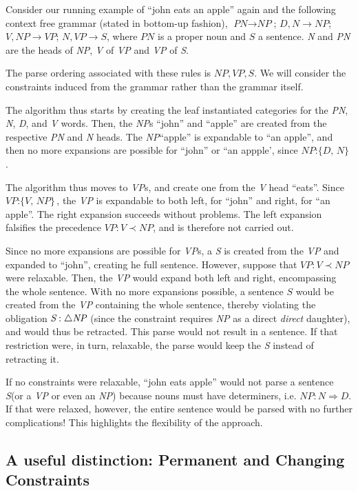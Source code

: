 \documentclass{llncs}
\newcommand{\constituency}[2]{\textit{#1} : \textit{#2}}
\newcommand{\obligation}[2]{\textit{#1} : \triangle \textit{#2}}
\newcommand{\precedence}[3]{\textit{#1} : \textit{#2} \prec \textit{#3}}
\newcommand{\requirement}[3]{\textit{#1} : \textit{#2} \Rightarrow \textit{#3}}
\newcommand{\PN}{\textit{PN}\xspace}
\newcommand{\NP}{\textit{NP}\xspace}
\newcommand{\VP}{\textit{VP}\xspace}
\newcommand{\Se}{\textit{S}\xspace}
\newcommand{\N}{\textit{N}\xspace}
\newcommand{\V}{\textit{V}\xspace}
\newcommand{\D}{\textit{D}\xspace}
\begin{document}
\begin{example}
  Consider our running example of ``john eats an apple'' again and the following context free grammar (stated in bottom-up fashion), $\PN \to \NP$; $D, N \to \NP$; $V,\NP \to \VP$; $N, \VP \to S$, where $\PN$ is a proper noun and $S$ a sentence. \N and \PN are the heads of \NP, \V of \VP and \VP of \Se.
  
  The parse ordering associated with these rules is $\NP,\VP,\Se$. We will consider the constraints induced from the grammar rather than the grammar itself.

The algorithm thus starts by creating the leaf instantiated categories for the \PN, \N, \D, and \V words. Then, the \NP{}s ``john'' and ``apple'' are created from the respective \PN and \N heads. The \NP ``apple'' is expandable to ``an apple'', and then no more expansions are possible for ``john'' or ``an appple', since $\constituency{NP}{\{D, N\}}$.

The algorithm thus moves to \VP{}s, and create one from the \V head ``eats''. Since $\constituency{VP}{\{V, NP\}}$, the \VP is expandable to both left, for ``john'' and right, for ``an apple''. The right expansion succeeds without problems. The left expansion falsifies the precedence $\precedence{VP}{V}{NP}$, and is therefore not carried out.

Since no more expansions are possible for \VP{}s, a \Se is created from the \VP and expanded to ``john'', creating he full sentence. However, suppose that $\precedence{VP}{V}{NP}$ were relaxable. Then, the \VP would expand both left and right, encompassing the whole sentence. With no more expansions possible, a sentence $S$ would be created from the \VP containing the whole sentence, thereby violating the obligation $\obligation{\Se}{\NP}$ (since the constraint requires \NP as a direct \emph{direct} daughter), and would thus be retracted. This parse would not result in a sentence. If that restriction were, in turn, relaxable, the parse would keep the \Se instead of retracting it.

If no constraints were relaxable, ``john eats apple'' would not parse a sentence \Se (or a \VP or even an \NP) because nouns must have determiners, i.e. $\requirement{NP}{N}{D}$. If that were relaxed, however, the entire sentence would be parsed with no further complications! This highlights the flexibility of the approach.
\end{example}

\subsection{A useful distinction: Permanent and Changing Constraints}
\label{ssec:constrs}
\end{document}
